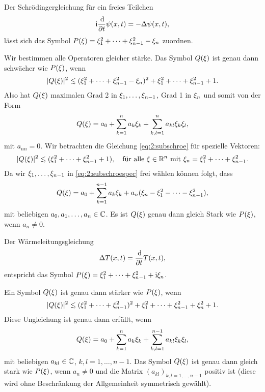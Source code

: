 \begin{exa}\label{exa:schroe}
Der Schrödingergleichung für ein freies Teilchen
\begin{equation}
\mathrm i\frac{\,\mathrm d}{\partial t}\psi(x,t)=-\Delta\psi(x,t),\end{equation}
lässt sich das Symbol $P(\xi)=\xi^2_1+\dots+\xi^2_{n-1}-\xi_n$ zuordnen.

Wir bestimmen alle Operatoren gleicher stärke.
Das Symbol $Q(\xi)$ ist genau dann schwächer wie $P(\xi)$,
wenn
\begin{equation}\label{eq:2:subschroe}
\abs{Q(\x)}^2\apprle(\x^2_1+\dots+\x^2_{n-1}-\x_n)^2+\x^2_1+\dots+\x^2_{n-1}+1.
\end{equation}
Also hat $Q(\xi)$ maximalen Grad 2 in $\xi_1,\dots,\xi_{n-1}$,
Grad 1 in $\xi_n$ und somit von der Form
\begin{equation}
Q(\xi)=a_0+\sum^n_{k=1}a_k\xi_k+\sum^n_{k,l=1}a_{kl}\xi_k\xi_l,
\end{equation}
mit $a_{nn}=0$.
Wir betrachten die Gleichung \eqref{eq:2:subschroe}
für spezielle Vektoren:
\begin{equation}\label{eq:2:subschroespec}
\abs{Q(\x)}^2\apprle(\x^2_1+\dots+\x^2_{n-1}+1),
\quad\text{für alle}~\x\in\R^n~\text{mit}~\x_n=\x^2_1+\dots+\x^2_{n-1}.
\end{equation}
Da wir $\xi_1,\dots,\xi_{n-1}$ in \eqref{eq:2:subschroespec} frei wählen können folgt, dass
\begin{equation}
Q(\xi)=a_0+\sum_{k=1}^{n-1}a_k\xi_k+a_n(\xi_n-\xi^2_1-\dots-\xi^2_{n-1}),
\end{equation}
mit beliebigen $a_0,a_1,\dots,a_n\in\mathbb C$.
Es ist $Q(\xi)$ genau dann gleich Stark wie $P(\xi)$,
wenn $a_n\neq0$.
\end{exa}

\begin{exa}\label{exa:heat}
Der Wärmeleitungsgleichung
\begin{equation}
\Delta T(x,t)=\frac{\,\mathrm d}{\partial t}T(x,t),
\end{equation}
entspricht das Symbol $P(\xi)=\xi^2_1+\dots+\xi^2_{n-1}+\mathrm i\xi_n$.

Ein Symbol $Q(\xi)$ ist genau dann stärker wie $P(\xi)$, wenn
\begin{equation}
\abs{Q(\x)}^2\apprle(\x^2_1+\dots+\x^2_{n-1})^2+\x^2_1+\dots+\x^2_{n-1}+\x^2_n+1.
\end{equation}
Diese Ungleichung ist genau dann erfüllt, wenn
\begin{equation}
Q(\xi)=a_0+\sum_{k=1}^na_k\xi_k+\sum_{k,l=1}^{n-1}a_{kl}\xi_k\xi_l,
\end{equation}
mit beliebigen $a_{kl}\in\mathbb C$, $k,l=1,\dots,n-1$.
Das Symbol $Q(\xi)$ ist genau dann gleich stark wie $P(\xi)$,
wenn $a_n\neq0$ und die Matrix $(a_{kl})_{k,l=1,\dots,n-1}$ positiv ist
(diese wird ohne Beschränkung der Allgemeinheit symmetrisch gewählt).
\end{exa}

